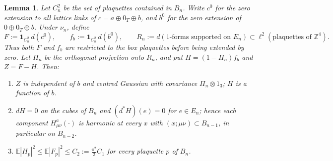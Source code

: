\documentclass[11pt,a4paper]{article}
\theoremstyle{plain}
\newtheorem{lemma}[theorem]{Lemma}
\theoremstyle{definition}
\theoremstyle{remark}
\numberwithin{equation}{section}
\newcommand{\Z}{\mathbb{Z}}
\newcommand{\E}{\mathbb{E}}
\begin{document}
\begin{lemma}\label{lem:H}
Let $C_n^2$ be the set of plaquettes contained in $B_n$.
Write $c^0$ for the zero extension to all lattice links of $c=a\oplus0_T\oplus b$, and $b^0$ for the zero extension of
$0\oplus0_T\oplus b$. Under $\nu_n$, define
\[
F:=\mathbf1_{C_n^2}\,d(c^0),
\qquad
f_b:=\mathbf1_{C_n^2}\,d(b^0),
\qquad
R_n:=d(1\text{-forms supported on }E_n)
\subset\ell^2(\text{plaquettes of }\Z^4).
\]
Thus both $F$ and $f_b$ are restricted to the box plaquettes before being extended by zero.
Let $\Pi_n$ be the orthogonal projection onto $R_n$, and put
$H=(1-\Pi_n)f_b$ and $Z=F-H$. Then:
\begin{enumerate}
\item[(H1)] $Z$ is independent of $b$ and centred Gaussian with covariance $\Pi_n\otimes1_3$; $H$ is a function of $b$.
\item[(H2)] $dH=0$ on the cubes of $B_n$ and $(d^*H)(e)=0$ for $e\in E_n$; hence each component $H^a_{\mu\nu}(\cdot)$ is harmonic at every $x$
with $(x;\mu\nu)\subset B_{n-1}$, in particular on $B_{n-2}$.
\item[(H3)] $\E|H_p|^2\le\E|F_p|^2\le C_2:=\frac{\pi^2}2C_1$ for every plaquette $p$ of $B_n$.
\end{enumerate}
\end{lemma}
\end{document}
